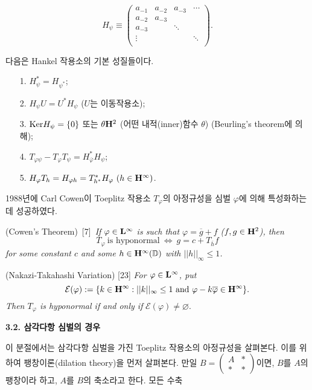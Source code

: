 \documentclass[12pt,a4paper,2sided]{article}
\newcommand{\vs}{\vspace}
\begin{document}
$$
H_\psi \equiv
\begin{pmatrix}
a_{-1}&a_{-2}&a_{-3}&\cdots\\
a_{-2}&a_{-3}& & \\
a_{-3}& &\ddots&  \\
\vdots& & &\ddots \\
\end{pmatrix}.
$$

다음은 Hankel 작용소의 기본 성질들이다.
\begin{itemize}
\item[1.]  $H_{\psi}^*=H_{{\psi}^*}$;
\item[2.]  $H_{\psi}U=U^*H_{\psi}$ ($U$는 이동작용소);
\item[3.]  ${\rm Ker}H_{\psi}=\{0\}$ 또는 $\theta{\bold H}^2$ (어떤 내적(inner)함수 $\theta$) (Beurling's theorem에 의해);
\item[4.]  $T_{\varphi\psi}-T_{\varphi}T_{\psi}=H_{\overline{\varphi}}^*H_{\psi}$;
\item[5.]  $H_{\varphi}T_{h}=H_{\varphi h}=T_{h^*}^*H_{\varphi}\ (h\in{\bold H}^{\infty})$.
\end{itemize}

1988년에 Carl Cowen이 Toeplitz 작용소 $T_\varphi$의 아정규성을 심벌
$\varphi$에 의해 특성화하는 데 성공하였다.

\vs{0.2cm}{\bf Theorem 3.1.3.} (Cowen's Theorem)\ [7]\ {\sl If
$\varphi\in{\bold L}^{\infty}$ is such that \linebreak
$\varphi=\overline{g} +f$ {\rm (}$f,g\in {\bold H}^2${\rm )}, then
$$
T_\varphi\ \mbox{is hyponormal}\ \Longleftrightarrow\ g=c+T_{\overline{h}}f
$$
for some constant $c$ and some $h\in{\bold
H}^{\infty}(\mathbb{D})$ with $||h||_{\infty}\le 1$.}


\vs{0.2cm}{\bf Theorem 3.1.4.} (Nakazi-Takahashi Variation) [23]
{\sl For $\varphi\in{\bold L}^{\infty}$, put
$$
\mathcal{E} (\varphi):=\{k\in{\bold H}^{\infty}:||k||_{\infty}\le 1\
\mbox{and}\ \varphi-k{\overline{\varphi}}\in{\bold H}^{\infty}\}.
$$
Then $T_\varphi$ is hyponormal if and only if} $\mathcal{E}
(\varphi)\neq\varnothing$.


\vspace{.3 cm}

{\bf 3.2. 삼각다항 심벌의 경우} \vspace{.3 cm}

이 분절에서는 삼각다항 심벌을 가진 Toeplitz 작용소의 아정규성을
살펴본다. 이를 위하여  팽창이론(dilation theory)을 먼저 살펴본다.
만일 $B=\begin{pmatrix} A&*\\ *&* \end{pmatrix}$이면, $B$를 $A$의
팽창이라 하고, $A$를 $B$의 축소라고 한다. 모든 수축 \linebreak
\end{document}
